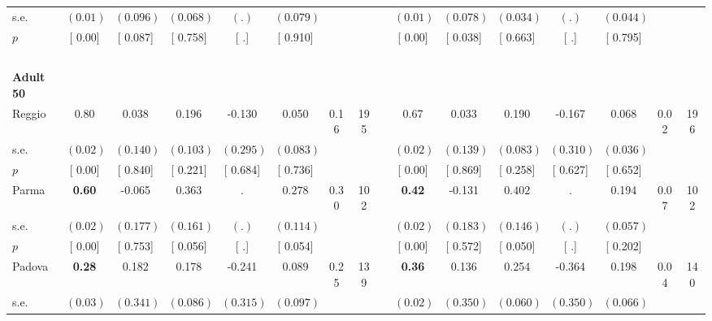 \begin{longtable}{L{8em} c c c c c c c p{1em} c c c c c c c}
\quad \quad \quad \quad s.e.& $ (     0.01)$ & $ (    0.096)$ & $ (    0.068)$ & $ (        .)$ & $ (    0.079)$ & & & & $ (     0.01)$ & $ (    0.078)$ & $ (    0.034)$ & $ (        .)$ & $ (    0.044)$ & &  \\*
\quad \quad \quad \quad $ p$ & [     0.00] & [    0.087] & [    0.758] & [        .] & [    0.910] & & & & [     0.00] & [    0.038] & [    0.663] & [        .] & [    0.795] & &  \\[1em]
~\\[1em]
\quad \quad \textbf{Adult 50} & & & & & & & & & & & & & & & \\* 
\quad \quad \quad Reggio& 0.80 &     0.038 &     0.196 &    -0.130 &     0.050 &      0.16 &       195 & & 0.67 &     0.033 &     0.190 &    -0.167 &     0.068 &      0.02 &       196  \\*
\quad \quad \quad \quad s.e.& $ (     0.02)$ & $ (    0.140)$ & $ (    0.103)$ & $ (    0.295)$ & $ (    0.083)$ & & & & $ (     0.02)$ & $ (    0.139)$ & $ (    0.083)$ & $ (    0.310)$ & $ (    0.036)$ & &  \\*
\quad \quad \quad \quad $ p$ & [     0.00] & [    0.840] & [    0.221] & [    0.684] & [    0.736] & & & & [     0.00] & [    0.869] & [    0.258] & [    0.627] & [    0.652] & &  \\[1em]
\quad \quad \quad Parma& \textbf{     0.60} &    -0.065 & $ \mathbf{    0.363}$ &         . & $ \mathbf{    0.278}$ &      0.30 &       102 & & \textbf{     0.42} &    -0.131 & $ \mathbf{    0.402}$ &         . &     0.194 &      0.07 &       102  \\*
\quad \quad \quad \quad s.e.& $ (     0.02)$ & $ (    0.177)$ & $ (    0.161)$ & $ (        .)$ & $ (    0.114)$ & & & & $ (     0.02)$ & $ (    0.183)$ & $ (    0.146)$ & $ (        .)$ & $ (    0.057)$ & &  \\*
\quad \quad \quad \quad $ p$ & [     0.00] & [    0.753] & [    0.056] & [        .] & [    0.054] & & & & [     0.00] & [    0.572] & [    0.050] & [        .] & [    0.202] & &  \\[1em]
\quad \quad \quad Padova& \textbf{     0.28} &     0.182 &     0.178 &    -0.241 &     0.089 &      0.25 &       139 & & \textbf{     0.36} &     0.136 &     0.254 &    -0.364 &     0.198 &      0.04 &       140  \\*
\quad \quad \quad \quad s.e.& $ (     0.03)$ & $ (    0.341)$ & $ (    0.086)$ & $ (    0.315)$ & $ (    0.097)$ & & & & $ (     0.02)$ & $ (    0.350)$ & $ (    0.060)$ & $ (    0.350)$ & $ (    0.066)$ & &  \\*

\end{longtable}
